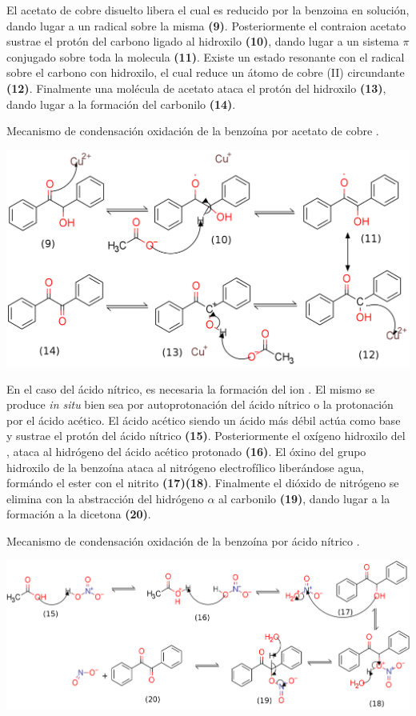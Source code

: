 \documentclass[fleqn,10pt]{SelfArx}
\begin{document}
El acetato de cobre disuelto libera  el cual es reducido por la benzoina en soluci\'on, dando lugar a un radical sobre la misma \textbf{(9)}. Posteriormente el contraion acetato sustrae el prot\'on del carbono ligado al hidroxilo \textbf{(10)}, dando lugar a un sistema $\pi$ conjugado sobre toda la molecula \textbf{(11)}. Existe un estado resonante con el radical sobre el carbono con hidroxilo, el cual reduce un \'atomo de cobre (II) circundante \textbf{(12)}. Finalmente una mol\'ecula de acetato ataca el prot\'on del hidroxilo \textbf{(13)}, dando lugar a la formaci\'on del carbonilo \textbf{(14)}.
\begin{scheme}[h]
	\centering
	\caption{Mecanismo de condensaci\'on oxidaci\'on de la benzo\'ina por acetato de cobre \cite{wigal2000}.}
	\includegraphics[width=\linewidth]{structures/mechanism-oxidationCu.png}
\end{scheme}

En el caso del \'acido n\'itrico, es necesaria la formaci\'on del ion . El mismo se produce \textit{in situ} bien sea por autoprotonaci\'on del \'acido n\'itrico o la protonaci\'on por el \'acido ac\'etico. El \'acido ac\'etico siendo un \'acido m\'as d\'ebil act\'ua como base y sustrae el prot\'on del \'acido n\'itrico \textbf{(15)}. Posteriormente el ox\'igeno hidroxilo del , ataca al hidr\'ogeno del \'acido ac\'etico protonado \textbf{(16)}. El \'oxino del grupo hidroxilo de la benzo\'ina ataca al nitr\'ogeno electrof\'ilico liber\'andose agua, form\'ando el ester con el nitrito \textbf{(17)(18)}. Finalmente el di\'oxido de nitr\'ogeno se elimina con la abstracci\'on del hidr\'ogeno $\alpha$ al carbonilo \textbf{(19)}, dando lugar a la formaci\'on a la dicetona \textbf{(20)}.
\begin{scheme}[h]
	\centering
	\caption{Mecanismo de condensaci\'on oxidaci\'on de la benzo\'ina por \'acido n\'itrico \cite{pavia2010}.}
	\includegraphics[width=\linewidth]{structures/mechanism-oxidation.png}
\end{scheme}
\end{document}
